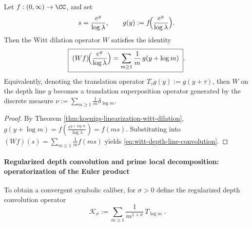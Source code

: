 \begin{corollary}\label{cor:witt-depth-line-convolution}
Let \(f:(0,\infty)\to\CC\), and set
\[
s=\frac{e^{y}}{\log\lambda},
\qquad
g(y):=f\!\Bigl(\frac{e^{y}}{\log\lambda}\Bigr).
\]
Then the Witt dilation operator \(W\) satisfies the identity
\begin{equation}\label{eq:witt-depth-line-convolution}
\boxed{\;
(Wf)\!\Bigl(\frac{e^{y}}{\log\lambda}\Bigr)
=\sum_{m\ge 1}\frac{1}{m}\,g(y+\log m)\; }.
\end{equation}
Equivalently, denoting the translation operator \(T_{\tau}g(y):=g(y+\tau)\), then \(W\) on the depth line \(y\) becomes a translation superposition operator generated by the discrete measure
\(
\nu:=\sum_{m\ge 1}\frac{1}{m}\delta_{\log m}
\).
\end{corollary}
\begin{proof}
By Theorem \ref{thm:koenigs-linearization-witt-dilation},
\(
g(y+\log m)=f(\tfrac{e^{y+\log m}}{\log\lambda})=f(ms)
\).
Substituting into \( (Wf)(s)=\sum_{m\ge 1}\frac{1}{m}f(ms)\) yields \eqref{eq:witt-depth-line-convolution}.
\end{proof}

\paragraph{Regularized depth convolution and prime local decomposition: operatorization of the Euler product}
To obtain a convergent symbolic caliber, for \(\sigma>0\) define the regularized depth convolution operator
\begin{equation}\label{eq:witt-depth-regularized-operator}
\boxed{\;
\mathcal{K}_{\sigma}
:=\sum_{m\ge 1}\frac{1}{m^{1+\sigma}}\,T_{\log m}\; }.
\end{equation}

